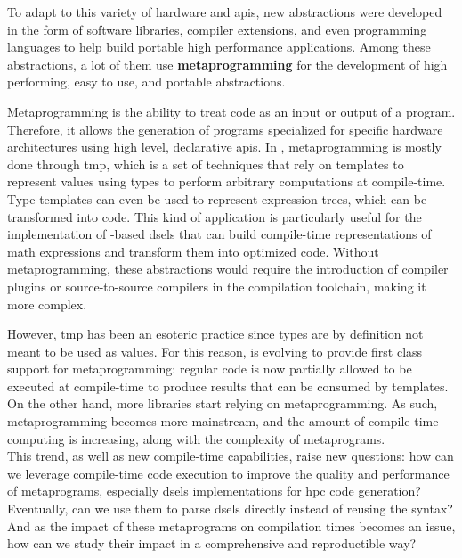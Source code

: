 \documentclass[main]{subfiles}
\begin{document}
To adapt to this variety of hardware and \glspl{api}, new abstractions
were developed in the form of software libraries, compiler extensions,
and even programming languages to help build portable high performance
applications.
Among these abstractions, a lot of them use \textbf{metaprogramming} for the
development of high performing, easy to use, and portable abstractions.

Metaprogramming is the ability to treat code as an input or output of a program.
Therefore, it allows the generation of programs specialized for
specific hardware architectures using high level, declarative \glspl{api}.
In \cpp, metaprogramming is mostly done through \gls{tmp}, which is a set of
techniques that rely on \cpp templates to represent values using types to
perform arbitrary computations at compile-time.
Type templates can even be used to represent expression trees,
which can be transformed into code. This kind of application is particularly
useful for the implementation of \cpp-based \glspl{dsel} that can build
compile-time representations of math expressions and transform them into
optimized code. Without metaprogramming, these abstractions would require
the introduction of compiler plugins or source-to-source compilers in the
compilation toolchain, making it more complex.

However, \gls{tmp} has been an esoteric practice since types are by definition
not meant to be used as values. For this reason, \cpp is evolving to provide
first class support for metaprogramming: regular \cpp code is now partially
allowed to be executed at compile-time to produce results that can be consumed
by templates. On the other hand, more \cpp libraries start relying on \cpp
metaprogramming. As such, \cpp metaprogramming becomes more mainstream,
and the amount of compile-time computing is increasing, along with
the complexity of \cpp metaprograms.
\\


This trend, as well as new \cpp compile-time capabilities, raise new questions:
how can we leverage compile-time \cpp code execution to improve the quality
and performance of \cpp metaprograms, especially \glspl{dsel} implementations
for \acrlong{hpc} code generation? Eventually, can we use them to parse
\glspl{dsel} directly instead of reusing the \cpp syntax?
And as the impact of these metaprograms on compilation times becomes an issue,
how can we study their impact in a comprehensive and reproductible way?
\\
\end{document}
